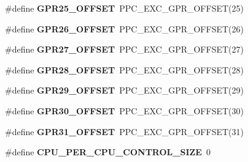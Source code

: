 \begin{DoxyCompactItemize}
\#define {\bfseries G\+P\+R25\+\_\+\+O\+F\+F\+S\+ET}~P\+P\+C\+\_\+\+E\+X\+C\+\_\+\+G\+P\+R\+\_\+\+O\+F\+F\+S\+ET(25)
\item 
\mbox{\label{group__RTEMSScoreCPUPowerPC_ga04060c7494f1b4760b0c16f69b43e040}} 
\#define {\bfseries G\+P\+R26\+\_\+\+O\+F\+F\+S\+ET}~P\+P\+C\+\_\+\+E\+X\+C\+\_\+\+G\+P\+R\+\_\+\+O\+F\+F\+S\+ET(26)
\item 
\mbox{\label{group__RTEMSScoreCPUPowerPC_ga02a1b08f3f455b79a0a25a255aeeeecc}} 
\#define {\bfseries G\+P\+R27\+\_\+\+O\+F\+F\+S\+ET}~P\+P\+C\+\_\+\+E\+X\+C\+\_\+\+G\+P\+R\+\_\+\+O\+F\+F\+S\+ET(27)
\item 
\mbox{\label{group__RTEMSScoreCPUPowerPC_gadadca8d546dcbd49b0f88940b27fd43e}} 
\#define {\bfseries G\+P\+R28\+\_\+\+O\+F\+F\+S\+ET}~P\+P\+C\+\_\+\+E\+X\+C\+\_\+\+G\+P\+R\+\_\+\+O\+F\+F\+S\+ET(28)
\item 
\mbox{\label{group__RTEMSScoreCPUPowerPC_ga3ab70aca2c114737278f1246ff283e0e}} 
\#define {\bfseries G\+P\+R29\+\_\+\+O\+F\+F\+S\+ET}~P\+P\+C\+\_\+\+E\+X\+C\+\_\+\+G\+P\+R\+\_\+\+O\+F\+F\+S\+ET(29)
\item 
\mbox{\label{group__RTEMSScoreCPUPowerPC_gafb34fdca71a8b4c6f5288970d848eed1}} 
\#define {\bfseries G\+P\+R30\+\_\+\+O\+F\+F\+S\+ET}~P\+P\+C\+\_\+\+E\+X\+C\+\_\+\+G\+P\+R\+\_\+\+O\+F\+F\+S\+ET(30)
\item 
\mbox{\label{group__RTEMSScoreCPUPowerPC_ga45f6312d90405e0da31fb9c5c4979d8a}} 
\#define {\bfseries G\+P\+R31\+\_\+\+O\+F\+F\+S\+ET}~P\+P\+C\+\_\+\+E\+X\+C\+\_\+\+G\+P\+R\+\_\+\+O\+F\+F\+S\+ET(31)
\item 
\mbox{\label{group__RTEMSScoreCPUPowerPC_gaf8e38596ad3db49995fd8eb9fb4e86b2}} 
\#define {\bfseries C\+P\+U\+\_\+\+P\+E\+R\+\_\+\+C\+P\+U\+\_\+\+C\+O\+N\+T\+R\+O\+L\+\_\+\+S\+I\+ZE}~0
\end{DoxyCompactItemize}
